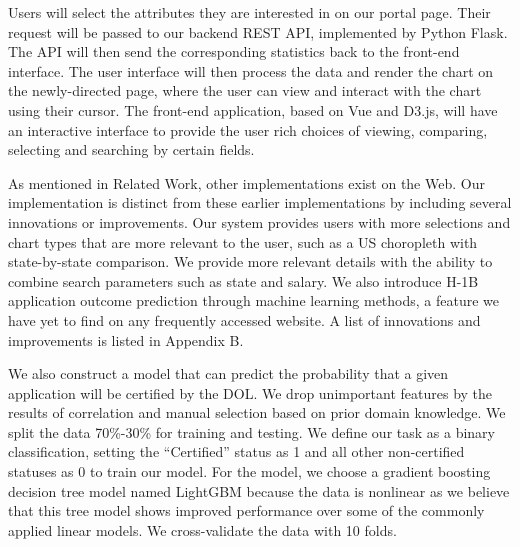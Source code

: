 \documentclass[sigconf]{acmart}
\begin{document}
Users will select the attributes they are interested in on our portal page. Their request will be passed to our 
backend REST API, implemented by Python Flask. The API will then send the corresponding statistics back to the 
front-end interface. The user interface will then process the data and render the chart on the newly-directed page, 
where the user can view and interact with the chart using their cursor. The front-end application, based on Vue and D3.js, 
will have an interactive interface to provide the user rich choices of viewing, comparing, selecting and searching by certain fields. 



As mentioned in Related Work, other implementations exist on the Web. Our implementation is distinct from these earlier 
implementations by including several innovations or improvements. Our system provides users with more selections and 
chart types that are more relevant to the user, such as a US choropleth with state-by-state comparison. 
We provide more relevant details with the ability to combine search parameters such as state and salary. 
We also introduce H-1B application outcome prediction through machine learning methods, a feature we have yet to find on 
any frequently accessed website. A list of innovations and improvements is listed in Appendix B.  


We also construct a model that can predict the probability that a given application will be certified by the DOL. 
We drop unimportant features by the results of correlation and manual selection based on prior domain knowledge. 
We split the data 70\%-30\% for training and testing. 
We define our task as a binary classification, setting the “Certified” status as 1 and all other non-certified statuses 
as 0 to train our model. For the model, we choose a gradient boosting decision tree model named LightGBM because the data 
is nonlinear as we believe that this tree model shows improved performance over some of the commonly applied linear models. 
We cross-validate the data with 10 folds. 
\end{document}
